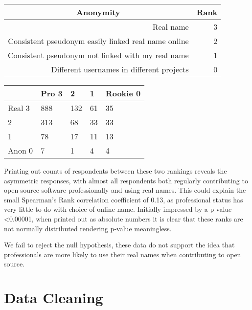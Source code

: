 \documentclass[journal,12pt,onecolumn,]{IEEEtran}
\begin{document}
\begin{table}[h]
    \begin{tabular}{|r|r|}
        \hline
        \multicolumn{1}{|c|}{\textbf{Anonymity}}            & \multicolumn{1}{c|}{\textbf{Rank}} \\ \hline
        Real name                                           & 3                                  \\ \hline
        Consistent pseudonym easily linked real name online & 2                                  \\ \hline
        Consistent pseudonym not linked with my real name   & 1                                  \\ \hline
        Different usernames in different projects           & 0                                  \\ \hline
    \end{tabular}
\end{table}

\begin{table}[h]
    \begin{tabular}{l|llll}
               & Pro 3 & 2   & 1  & Rookie 0 \\ \hline
        Real 3 & 888   & 132 & 61 & 35       \\
        2      & 313   & 68  & 33 & 33       \\
        1      & 78    & 17  & 11 & 13       \\
        Anon 0 & 7     & 1   & 4  & 4        \\
    \end{tabular}
\end{table}

Printing out counts of respondents between these two rankings reveals the asymmetric responses, with almost all respondents both regularly contributing to open source software professionally and using real names.
This could explain the small Spearman's Rank correlation coefficient of 0.13, as professional status has very little to do with choice of online name.
Initially impressed by a p-value <0.00001, when printed out as absolute numbers it is clear that these ranks are not normally distributed rendering p-value meaningless.

We fail to reject the null hypothesis, these data do not support the idea that professionals are more likely to use their real names when contributing to open source.

\section{Data Cleaning}
\end{document}
